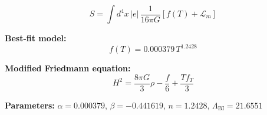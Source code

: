 
\begin{equation}
  S = \int d^4x \, |e| \, \frac{1}{16\pi G} \left[ f(T) + \mathcal{L}_m \right]
\end{equation}

\textbf{Best-fit model:}
\begin{equation}
  f(T) = 0.000379 \, T^{1.2428}
\end{equation}

\textbf{Modified Friedmann equation:}
\begin{equation}
  H^2 = \frac{8\pi G}{3} \rho - \frac{f}{6} + \frac{T f_T}{3}
\end{equation}

\textbf{Parameters:}
$\alpha = 0.000379$, \quad
$\beta = -0.441619$, \quad
$n = 1.2428$, \quad
$\Lambda_{\text{BI}} = 21.6551$